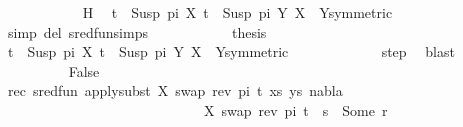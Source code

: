 \begin{isabellebody}
\ \ \ \ \ \ \ \ \ \ \isamarkupfalse%
\ H\ \isamarkupfalse%
\ {\isacartoucheopen}t{}\ {\isacharequal}{\kern0pt}\ Susp\ pi\ X{\isacartoucheclose}\ {\isacartoucheopen}t{}\ {\isacharequal}{\kern0pt}\ Susp\ pi{}\ Y{\isacartoucheclose}\ {\isacartoucheopen}X\ {\isacharequal}{\kern0pt}\ Y{\isacartoucheclose}{\isacharbrackleft}{\kern0pt}symmetric{\isacharbrackright}{\kern0pt}\ \isanewline
\ \ \ \ \ \ \ \ \ \ \isamarkupfalse%
\ {\isacharparenleft}{\kern0pt}simp\ del{\isacharcolon}{\kern0pt}\ sred{\isacharunderscore}{\kern0pt}fun{\isachardot}{\kern0pt}simps{\isacharparenright}{\kern0pt}\isanewline
\ \ \ \ \ \ \ \ \isamarkupfalse%
\ \isamarkupfalse%
\ {\isacharquery}{\kern0pt}thesis\ \isamarkupfalse%
\ {\isacartoucheopen}t{}\ {\isacharequal}{\kern0pt}\ Susp\ pi\ X{\isacartoucheclose}\ {\isacartoucheopen}t{}\ {\isacharequal}{\kern0pt}\ Susp\ pi{}\ Y{\isacartoucheclose}\ {\isacartoucheopen}X\ {\isacharequal}{\kern0pt}\ Y{\isacartoucheclose}{\isacharbrackleft}{\kern0pt}symmetric{\isacharbrackright}{\kern0pt}\ \isanewline
\ \ \ \ \ \ \ \ \ \ \isamarkupfalse%
\ step\ \isamarkupfalse%
\ blast\isanewline
\ \ \ \ \ \ \isamarkupfalse%
\isanewline
\ \ \ \ \ \ \ \ \isamarkupfalse%
\ False\isanewline
\ \ \ \ \ \ \ \ %
\isanewline
\ \ \ \ \ \ \ \ \isamarkupfalse%
\ rec{\isacharcolon}{\kern0pt}\ {\isachardoublequoteopen}sred{\isacharunderscore}{\kern0pt}fun\ {\isacharparenleft}{\kern0pt}apply{\isacharunderscore}{\kern0pt}subst\ {\isacharbrackleft}{\kern0pt}{\isacharparenleft}{\kern0pt}X{\isacharcomma}{\kern0pt}\ swap\ {\isacharparenleft}{\kern0pt}rev\ pi{\isacharparenright}{\kern0pt}\ t{}{\isacharparenright}{\kern0pt}{\isacharbrackright}{\kern0pt}\ {\isacharparenleft}{\kern0pt}xs{\isacharcomma}{\kern0pt}\ ys{\isacharparenright}{\kern0pt}{\isacharcomma}{\kern0pt}\ nabla{\isacharcomma}{\kern0pt}\isanewline
\ \ \ \ \ \ \ \ \ \ \ \ \ \ \ \ \ \ \ \ \ \ \ \ \ \ \ \ \ {\isacharbrackleft}{\kern0pt}{\isacharparenleft}{\kern0pt}X{\isacharcomma}{\kern0pt}\ swap\ {\isacharparenleft}{\kern0pt}rev\ pi{\isacharparenright}{\kern0pt}\ t{}{\isacharparenright}{\kern0pt}{\isacharbrackright}{\kern0pt}\ {\isasymbullet}\ s{\isacharparenright}{\kern0pt}\ {\isacharequal}{\kern0pt}\ Some\ r{\isachardoublequoteclose}\isanewline

\end{isabellebody}
